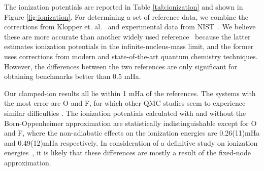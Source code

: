 \documentclass[pra,superscriptaddress,groupedaddress,twocolumn]{revtex4}
\begin{document}

The ionization potentials are reported in Table \ref{tab:ionization} and shown in Figure \ref{fig:ionization}. For determining a set of reference data, we combine the corrections from Klopper et. al.~\cite{Klopper_IP} and experimental data from NIST~\cite{NIST_Atoms}. We believe these are more accurate than another widely used reference~\cite{Davidson_Atoms} because the latter estimates ionization potentials in the infinite-nucleus-mass limit, and the former uses corrections from modern and state-of-the-art quantum chemistry techniques. However, the differences between the two references are only significant for obtaining benchmarks better than 0.5 mHa.
 
Our clamped-ion results all lie within 1 mHa of the references. The systems with the most error are O and F, for which other QMC studies seem to experience similar difficulties \cite{Seth_Bench,Booth_FCIQMC,Brown_Bench,Morale_Bench}. 
The ionization potentials calculated with and without the Born-Oppenheimer approximation are statistically indistinguishable except for O and F, where the non-adiabatic effects on the ionization energies are 0.26(11)mHa and 0.49(12)mHa respectively.  In consideration of a definitive study on ionization energies~\cite{Klopper_IP}, it is likely that these differences are mostly a result of the fixed-node approximation.   
\end{document}
